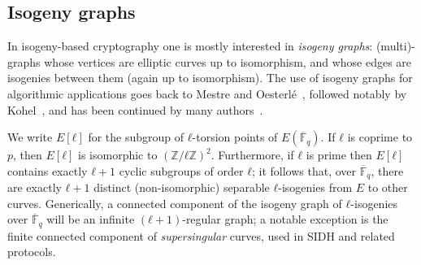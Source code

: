 \documentclass{article}
\newcommand{\Fbar}{\overline{\mathbb{F}}}
\theoremstyle{definition}
\begin{document}
\subsection{Isogeny graphs}
\label{sec:isogeny-graphs}

In isogeny-based cryptography one is mostly interested in
\emph{isogeny graphs}: (multi)-graphs whose vertices are
elliptic curves up to isomorphism, and whose edges are isogenies
between them (again up to isomorphism).
The use of isogeny graphs for algorithmic applications 
goes back to Mestre and Oesterlé~\cite{Mestre},
followed notably by Kohel~\cite{kohel},
and has been continued by many
authors~\cite{Gal,fouquet+morain02,GHS,MiretMSTV06,jao+miller+venkatesan09}.

We write $E[ℓ]$ for the subgroup of $ℓ$-torsion points of
$E(\Fbar_q)$.  If $ℓ$ is coprime to $p$, then $E[ℓ]$ is isomorphic to
$(ℤ/ℓℤ)^2$.  Furthermore, if $ℓ$ is prime then $E[ℓ]$ contains exactly
$ℓ+1$ cyclic subgroups of order $ℓ$; it follows that, over $\Fbar_q$,
there are exactly $ℓ+1$ distinct (non-isomorphic) separable $ℓ$-isogenies 
from $E$ to other curves.
Generically, a connected component of the isogeny graph of
$ℓ$-isogenies over $\Fbar_q$ will be an infinite $(ℓ+1)$-regular
graph; a notable exception is the finite connected component of
\emph{supersingular} curves, used in SIDH and related protocols.
\end{document}
